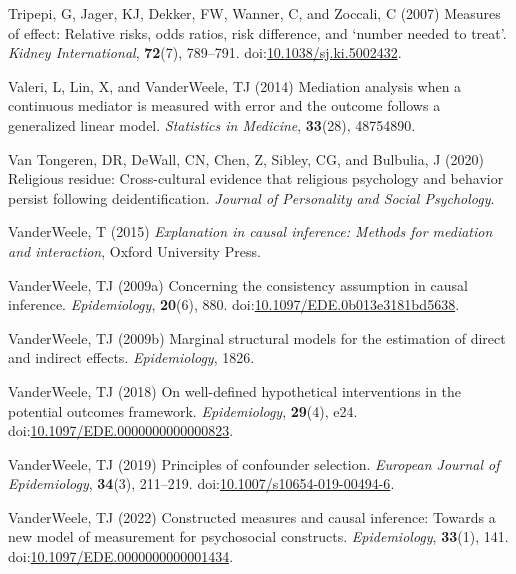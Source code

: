 \documentclass[
  singlecolumn]{article}
\newlength{\cslhangindent}
\newlength{\cslentryspacingunit} %
\newenvironment{CSLReferences}[2] %
 {%
  \setlength{\parindent}{0pt}
  \ifodd #1
  \let\oldpar\par
  \def\par{\hangindent=\cslhangindent\oldpar}
  \fi
  \setlength{\parskip}{#2\cslentryspacingunit}
 }%
 {}
\begin{document}
\begin{CSLReferences}{1}{0}
\leavevmode{}%
Tripepi, G, Jager, KJ, Dekker, FW, Wanner, C, and Zoccali, C (2007)
Measures of effect: Relative risks, odds ratios, risk difference, and
{`}number needed to treat{'}. \emph{Kidney International},
\textbf{72}(7), 789--791.
doi:\href{https://doi.org/10.1038/sj.ki.5002432}{10.1038/sj.ki.5002432}.

\leavevmode{}%
Valeri, L, Lin, X, and VanderWeele, TJ (2014) Mediation analysis when a
continuous mediator is measured with error and the outcome follows a
generalized linear model. \emph{Statistics in Medicine},
\textbf{33}(28), 48754890.

\leavevmode{}%
Van Tongeren, DR, DeWall, CN, Chen, Z, Sibley, CG, and Bulbulia, J
(2020) Religious residue: Cross-cultural evidence that religious
psychology and behavior persist following deidentification.
\emph{Journal of Personality and Social Psychology}.

\leavevmode{}%
VanderWeele, T (2015) \emph{Explanation in causal inference: Methods for
mediation and interaction}, Oxford University Press.

\leavevmode{}%
VanderWeele, TJ (2009a) Concerning the consistency assumption in causal
inference. \emph{Epidemiology}, \textbf{20}(6), 880.
doi:\href{https://doi.org/10.1097/EDE.0b013e3181bd5638}{10.1097/EDE.0b013e3181bd5638}.

\leavevmode{}%
VanderWeele, TJ (2009b) Marginal structural models for the estimation of
direct and indirect effects. \emph{Epidemiology}, 1826.

\leavevmode{}%
VanderWeele, TJ (2018) On well-defined hypothetical interventions in the
potential outcomes framework. \emph{Epidemiology}, \textbf{29}(4), e24.
doi:\href{https://doi.org/10.1097/EDE.0000000000000823}{10.1097/EDE.0000000000000823}.

\leavevmode{}%
VanderWeele, TJ (2019) Principles of confounder selection.
\emph{European Journal of Epidemiology}, \textbf{34}(3), 211--219.
doi:\href{https://doi.org/10.1007/s10654-019-00494-6}{10.1007/s10654-019-00494-6}.

\leavevmode{}%
VanderWeele, TJ (2022) Constructed measures and causal inference:
Towards a new model of measurement for psychosocial constructs.
\emph{Epidemiology}, \textbf{33}(1), 141.
doi:\href{https://doi.org/10.1097/EDE.0000000000001434}{10.1097/EDE.0000000000001434}.


\end{CSLReferences}
\end{document}
